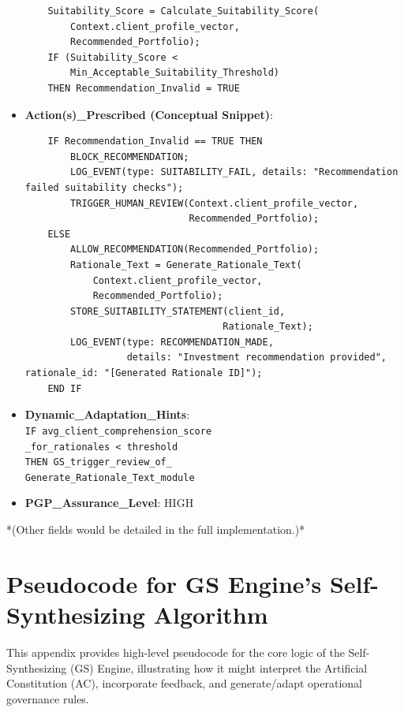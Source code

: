 \documentclass[sigconf,review,anonymous=false]{acmart} %
\begin{document}
\begin{itemize}
{\begin{verbatim}
    Suitability_Score = Calculate_Suitability_Score(
        Context.client_profile_vector,
        Recommended_Portfolio);
    IF (Suitability_Score <
        Min_Acceptable_Suitability_Threshold)
    THEN Recommendation_Invalid = TRUE
    \end{verbatim}
    }
    \item \textbf{Action(s)\_Prescribed (Conceptual Snippet)}:
    {\tiny
    \begin{verbatim}
    IF Recommendation_Invalid == TRUE THEN
        BLOCK_RECOMMENDATION;
        LOG_EVENT(type: SUITABILITY_FAIL, details: "Recommendation failed suitability checks");
        TRIGGER_HUMAN_REVIEW(Context.client_profile_vector,
                             Recommended_Portfolio);
    ELSE
        ALLOW_RECOMMENDATION(Recommended_Portfolio);
        Rationale_Text = Generate_Rationale_Text(
            Context.client_profile_vector,
            Recommended_Portfolio);
        STORE_SUITABILITY_STATEMENT(client_id,
                                   Rationale_Text);
        LOG_EVENT(type: RECOMMENDATION_MADE,
                  details: "Investment recommendation provided", rationale_id: "[Generated Rationale ID]");
    END IF
    \end{verbatim}
    }
    \item \textbf{Dynamic\_Adaptation\_Hints}: \\
    \texttt{IF avg\_client\_comprehension\_score} \\
    \texttt{\_for\_rationales < threshold} \\
    \texttt{THEN GS\_trigger\_review\_of\_} \\
    \texttt{Generate\_Rationale\_Text\_module}
    \item \textbf{PGP\_Assurance\_Level}: HIGH
\end{itemize}
*(Other fields would be detailed in the full implementation.)*

\section{Pseudocode for GS Engine's Self-Synthesizing Algorithm}
\label{app:gs_pseudocode}
This appendix provides high-level pseudocode for the core logic of the Self-Synthesizing (GS) Engine, illustrating how it might interpret the Artificial Constitution (AC), incorporate feedback, and generate/adapt operational governance rules.
\end{document}
